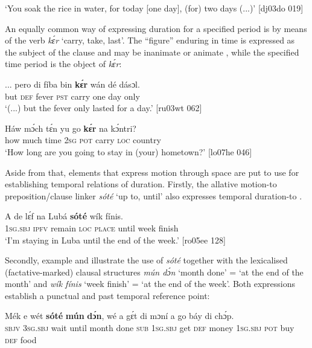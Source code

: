 \glt ‘You soak the rice in water, for today [one day], (for) two days (...)’ [dj03do 019]
\z

An equally common way of expressing duration for a specified period is by means of the verb \textit{kɛ́r} ‘carry, take, last’. The “figure” enduring in time is expressed as the subject of the clause and may be inanimate  or animate , while the specified time period is the object of \textit{kɛ́r}: 


\ea%
    \label{ex:key:1024}
    \gll \op...\cp{}  pero  di  fíba    bin   \textbf{kɛ́r}    wán    dé  dásɔl.\\
{}  but    \textsc{def}  fever  \textsc{pst}  carry  one    day  only\\

\glt ‘(...) but the fever only lasted for a day.’ [ru03wt 062]
\z


\ea%
    \label{ex:key:1025}
    \gll Háw  mɔ́ch  tɛ́n    yu  go   \textbf{kɛ́r}    na  kɔ́ntri?\\
how    much  time    \textsc{2sg}  \textsc{pot}  carry  \textsc{loc}  country\\

\glt ‘How long are you going to stay in (your) hometown?’ [lo07he 046]
\z

Aside from that, elements that express motion through space are put to use for establishing temporal relations of duration. Firstly, the allative motion{}-to preposition/clause linker \textit{sóté} ‘up to, until’ also expresses temporal duration-to . 


\ea%
    \label{ex:key:1026}
    \gll A    de  lɛ́f    na  Lubá  \textbf{sóté}    wík    fínis.\\
\textsc{1sg.sbj}  \textsc{ipfv}  remain  \textsc{loc}  \textsc{place}  until  week  finish\\

\glt ‘I’m staying in Luba until the end of the week.’ [ro05ee 128]
\z

Secondly, example  and  illustrate the use of \textit{sóté} together with the lexicalised (factative-marked) clausal structures \textit{mún dɔ́n} ‘month done’ = ‘at the end of the month’ and \textit{wík fínis} ‘week finish’ = ‘at the end of the week’. Both expressions establish a punctual and past temporal reference point:


\ea%
    \label{ex:key:1027}
    \gll Mék  e    wét     \textbf{sóté}     \textbf{mún}   \textbf{dɔ́n},    wé  a    gɛ́t
di  mɔní  a    go  báy  di  chɔ́p.\\
\textsc{sbjv}  \textsc{3sg.sbj}  wait    until  month  done  \textsc{sub}  \textsc{1sg.sbj}  get
\textsc{def}  money  \textsc{1sg.sbj}  \textsc{pot}  buy  \textsc{def}  food\\

